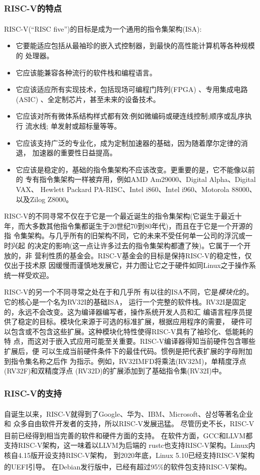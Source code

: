 \documentclass[UTF8,fontset=none,linespread=1.15]{ctexart}
\let\nosupcite\cite
\renewcommand*{\cite}[1]{\textsuperscript{\nosupcite{#1}}}
\begin{document}
\subsubsection{RISC-V的特点}
RISC-V(“RISC five”)的目标是成为一个通用的指令集架构(ISA):\cite{bib:risc-v-manual}
\begin{itemize}
\item 它要能适应包括从最袖珍的嵌入式控制器，到最快的高性能计算机等各种规模的
处理器。
\item 它应该能兼容各种流行的软件栈和编程语言。
\item 它应该适应所有实现技术，包括现场可编程门阵列(FPGA)
 、专用集成电路(ASIC) 、全定制芯片，甚至未来的设备技术。
\item 它应该对所有微体系结构样式都有效:例如微编码或硬连线控制;顺序或乱序执行
流水线; 单发射或超标量等等。
\item 它应该支持广泛的专业化，成为定制加速器的基础，因为随着摩尔定律的消退，
加速器的重要性日益提高。
\item 它应该是稳定的，基础的指令集架构不应该改变。更重要的是，它不能像以前的
专有指令集架构一样被弃用，例如AMD Am29000、Digital Alpha、Digital VAX、
Hewlett Packard PA-RISC、Intel i860、Intel i960、Motorola 88000、以及Zilog
Z8000。
\end{itemize}

RISC-V的不同寻常不仅在于它是一个最近诞生的指令集架构(它诞生于最近十
年，而大多数其他指令集都诞生于20世纪70到80年代)，而且在于它是一个开源的指
令集架构。与几乎所有的旧架构不同，它的未来不受任何单一公司的浮沉或一时兴起
的决定的影响(这一点让许多过去的指令集架构都遭了殃)。它属于一个开放的，非
营利性质的基金会。RISC-V基金会的目标是保持RISC-V的稳定性，仅仅出于技术原
因缓慢而谨慎地发展它，并力图让它之于硬件如同Linux之于操作系统一样受欢迎。

RISC-V的另一个不同寻常之处在于和几乎所
有以往的ISA不同，它是\textit{模块化}的。它的核心是一个名为RV32I的基础ISA，
运行一个完整的软件栈。RV32I是固定的，永远不会改变。这为编译器编写者，操作系统开发人员和汇
编语言程序员提供了稳定的目标。模块化来源于可选的标准扩展，根据应用程序的需要，
硬件可以包含或不包含这些扩展。这种模块化特性使得RISC-V具有了袖珍化、低能耗的特
点，而这对于嵌入式应用可能至关重要。RISC-V编译器得知当前硬件包含哪些扩展后，便
可以生成当前硬件条件下的最佳代码。惯例是把代表扩展的字母附加到指令集名称之后作
为指示。例如，RV32IMFD将乘法(RV32M)，单精度浮点(RV32F)和双精度浮点
(RV32D)的扩展添加到了基础指令集(RV32I)中。

\subsubsection{RISC-V的支持}
自诞生以来，RISC-V就得到了Google、华为、IBM、Microsoft、삼성等著名企业\cite{bib:risc-v-manual}和
众多自由软件开发者的支持，所以RISC-V发展迅猛。
尽管历史不长，RISC-V目前已经得到相当完善的软件和硬件方面的支持。
在软件方面，GCC\cite{bib:riscv-gcc}和LLVM\cite{bib:riscv-llvm}都
支持RISC-V架构，这一味着以LLVM为后端的
rustc也支持RISC-V架构。Linux内核自4.15版开设支持RISC-V架构，
到2020年底，Linux 5.10已经支持RISC-V架构的UEFI引导。\cite{bib:riscv-linux}
在Debian发行版中，已经有超过95\%的软件包支持RISC-V架构。\cite{bib:riscv-debian}
\end{document}
